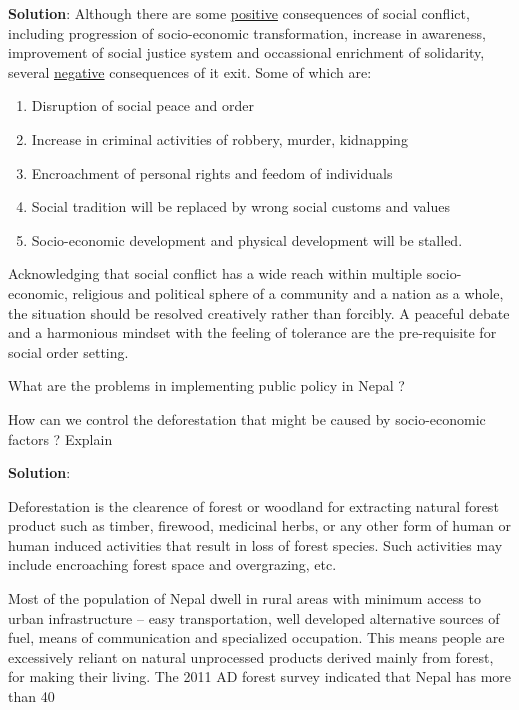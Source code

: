 \documentclass[
]{book}
\newcommand{\question}{\item}
\newenvironment{solution}{ {\bfseries Solution}:}{}
\begin{document}
\begin{questions}
\begin{solution}
Although there are some \underline{positive} consequences of social conflict, including progression of socio-economic transformation, increase in awareness, improvement of social justice system and occassional enrichment of solidarity, several \underline{negative} consequences of it exit. Some of which are:

\begin{enumerate}
\item Disruption of social peace and order
\item Increase in criminal activities of robbery, murder, kidnapping
\item Encroachment of personal rights and feedom of individuals
\item Social tradition will be replaced by wrong social customs and values
\item Socio-economic development and physical development will be stalled.
\end{enumerate}

Acknowledging that social conflict has a wide reach within multiple socio-economic, religious and political sphere of a community and a nation as a whole, the situation should be resolved creatively rather than forcibly. A peaceful debate and a harmonious mindset with the feeling of tolerance are the pre-requisite for social order setting.
\end{solution}

\question What are the problems in implementing public policy in Nepal ?

\question How can we control the deforestation that might be caused by socio-economic factors ? Explain

\begin{solution}

Deforestation is the clearence of forest or woodland for extracting natural forest product such as timber, firewood, medicinal herbs, or any other form of human or human induced activities that result in loss of forest species. Such activities may include encroaching forest space and overgrazing, etc.

Most of the population of Nepal dwell in rural areas with minimum access to urban infrastructure -- easy transportation, well developed alternative sources of fuel, means of communication and specialized occupation. This means people are excessively reliant on natural unprocessed products derived mainly from forest, for making their living. The 2011 AD forest survey indicated that Nepal has more than 40%


\end{solution}
\end{questions}
\end{document}
